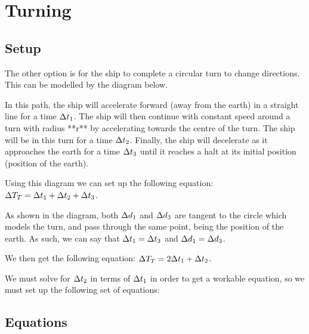 \section{Turning}
	\subsection{Setup}
		The other option is for the ship to complete a circular turn to change directions.
		This can be modelled by the diagram below.
		
		In this path, the ship will accelerate forward (away from the earth) in a straight line for a time $\mathrm{\Delta} t_1$.
		The ship will then continue with constant speed around a turn with radius **r** by accelerating towards the centre of the turn.
		The ship will be in this turn for a time $\mathrm{\Delta} t_2$. Finally, the ship will decelerate as it approaches the  earth for a time $\mathrm{\Delta} t_3$ until it reaches a halt at its initial position (position of the earth).

		Using this diagram we can set up the following equation: $\mathrm{\Delta} T_T = \mathrm{\Delta} t_1 + \mathrm{\Delta} t_2 + \mathrm{\Delta} t_3$.

		As shown in the diagram, both $\mathrm{\Delta} d_1$ and $\mathrm{\Delta} d_3$ are tangent to the circle which models the turn, and pass through the same point, being the position of the earth.
		As such, we can say that $\mathrm{\Delta} t_1 = \mathrm{\Delta} t_3$ and $\mathrm{\Delta} d_1 = \mathrm{\Delta} d_3$.

		We then get the following equation: $\mathrm{\Delta} T_T = 2\mathrm{\Delta} t_1 + \mathrm{\Delta} t_2$.

		We must solve for $\mathrm{\Delta} t_2$ in terms of $\mathrm{\Delta} t_1$ in order to get a workable equation, so we must set up the following set of 
		equations:
	\subsection{Equations}
